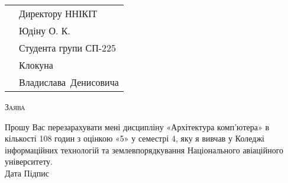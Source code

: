 \documentclass[a4paper,oneside,DIV=9,12pt]{scrartcl}
\begin{document}
	\pagestyle{empty}
%		
	
	\begin{tabular}{p{228pt}l}
		& Директору ННІКІТ\\
		& Юдіну О. К.\\
		& Студента групи СП-225\\
		& Клокуна\\
		& Владислава~Денисовича\\
	\end{tabular}
	
	\begin{center}
	\textsc{Заява}
	\end{center}
	
	Прошу Вас перезарахувати мені дисципліну «Архітектура комп'ютера» в кількості 108 годин з оцінкою «5» у семестрі 4, яку я вивчав у Коледжі інформаційних технологій та землевпорядкування Національного авіаційного університету.\\[\baselineskip]
	
	\noindent Дата \hspace{\fill} Підпис
	
\end{document}
